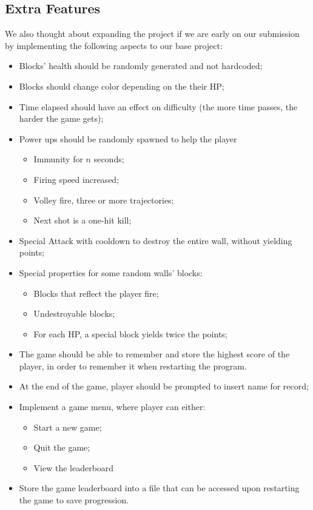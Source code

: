 \documentclass[a4paper]{article}
\begin{document}
\subsection{Extra Features}
We also thought about expanding the project if we are early on our submission by implementing the following aspects to our base project:
\begin{itemize}
  \item Blocks' health should be randomly generated and not hardcoded;
  \item Blocks should change color depending on the their HP;
  \item Time elapsed should have an effect on difficulty (the more time passes, the harder the game gets);
  \item Power ups should be randomly spawned to help the player
  \begin{itemize}
    \item Immunity for $n$ seconds;
    \item Firing speed increased;
    \item Volley fire, three or more trajectories;
    \item Next shot is a one-hit kill;
  \end{itemize}
  \item Special Attack with cooldown to destroy the entire wall, without yielding points;
  \item Special properties for some random walls' blocks:
  \begin{itemize}
    \item Blocks that reflect the player fire;
    \item Undestroyable blocks;
    \item For each HP, a special block yields twice the points;
  \end{itemize}
  \item The game should be able to remember and store the highest score of the player, in order to remember it when restarting the program.
  \item At the end of the game, player should be prompted to insert name for record;
  \item Implement a game menu, where player can either:
  \begin{itemize}
    \item Start a new game;
    \item Quit the game;
    \item View the leaderboard
  \end{itemize}
  \item Store the game leaderboard into a file that can be accessed upon restarting the game to save progression.
\end{itemize}
\newpage
\end{document}
